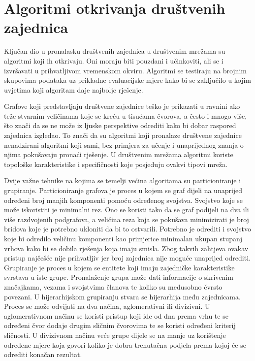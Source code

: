 \chapter{Algoritmi otkrivanja društvenih zajednica}

Ključan dio u pronalasku društvenih zajednica u društvenim mrežama su algoritmi koji ih otkrivaju. Oni moraju biti pouzdani i učinkoviti, ali se i izvršavati u prihvatljivom vremenskom okviru. Algoritmi se testiraju na brojnim skupovima podataka uz prikladne evaluacijske mjere kako bi se zaključilo u kojim uvjetima koji algoritam daje najbolje rješenje. 

Grafove koji predstavljaju društvene zajednice teško je prikazati u ravnini ako teže stvarnim veličinama koje se kreću u tisućama čvorova, a često i mnogo više, što znači da se ne može iz ljuske perspektive odrediti kako bi dobar raspored zajednica izgledao. To znači da su algoritmi koji pronalaze društvene zajednice nenadzirani algoritmi koji sami, bez primjera za učenje i unaprijednog znanja o njima pokušavaju pronaći rješenje. U društvenim mrežama algoritmi koriste topološke karakteristike i specifičnosti koje posjeduju ovakvi tipovi mreža. 

Dvije važne tehnike na kojima se temelji većina algoritama su particioniranje i grupiranje. Particioniranje grafova je proces u kojem se graf dijeli na unaprijed određeni broj manjih komponenti pomoću određenog svojstva. Svojstvo koje se može iskoristiti je minimalni rez. Ono se koristi tako da se graf podijeli na dva ili više razdvojenih podgrafova, a veličina reza koja se pokušava minimizirati je broj bridova koje je potrebno ukloniti da bi to ostvarili. Potrebno je odrediti i svojstvo koje bi odredilo veličinu komponenti kao primjerice minimalan ukupan stupanj vrhova kako bi se dobila rješenja koja imaju smisla. Zbog takvih zahtjeva ovakav pristup najčešće nije prihvatljiv jer broj zajednica nije moguće unaprijed odrediti.
Grupiranje je proces u kojem se entitete koji imaju zajedničke karakteristike svrstava u iste grupe. Pronalaženje grupa može dati informacije o skrivenim značajkama, vezama i svojstvima članova te koliko su međusobno čvrsto povezani. U hijerarhijskom grupiranju stvara se hijerarhija među zajednicama. Proces se može odvijati na dva načina, aglomerativni ili divizivni. U aglomerativnom načinu se koristi pristup koji ide od dna prema vrhu te se određeni čvor dodaje drugim sličnim čvorovima te se koristi određeni kriterij sličnosti. U divizivnom načinu veće grupe dijele se na manje uz korištenje određene mjere koja govori koliko je dobra trenutačna podjela prema kojoj će se odrediti konačan rezultat.



